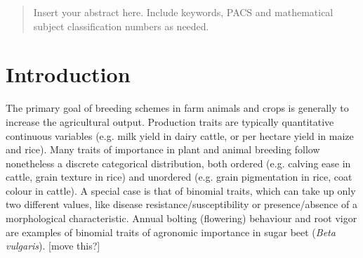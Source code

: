 

\date{Received: 05 August 2014 / Accepted:}

\maketitle

\begin{abstract}
Insert your abstract here. Include keywords, PACS and mathematical
subject classification numbers as needed.
\end{abstract}

\section{Introduction}
\label{intro}
The primary goal of breeding schemes in farm animals and crops is
generally to increase the agricultural output. Production traits are
typically quantitative continuous variables (e.g. milk
yield in dairy cattle, or per hectare yield in maize and rice).
Many traits of importance in plant and animal breeding follow nonetheless
a discrete categorical distribution, both ordered (e.g. calving ease in
cattle, grain texture in rice) and unordered
(e.g. grain pigmentation in rice, coat colour in cattle). A special case
is that of binomial traits, which can take up only two different values,
like disease resistance/susceptibility or presence/absence of a
morphological characteristic. 
Annual bolting (flowering) behaviour and root vigor are examples of binomial traits of agronomic
importance in sugar beet (\emph{Beta vulgaris}). [move this?] 

